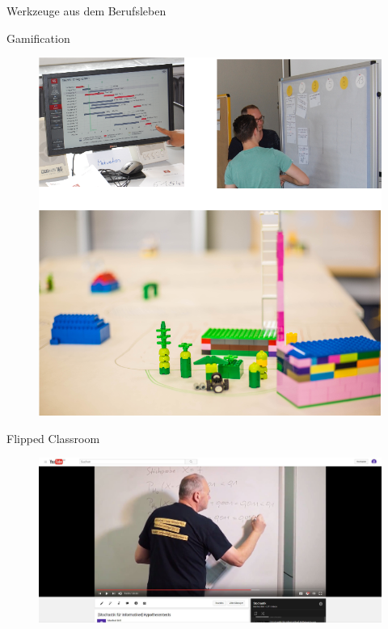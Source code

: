 \documentclass[final,hyperref={pdfpagelabels=false}]{beamer}
\begin{document}
\begin{frame}[t]
\begin{columns}[t]
\begin{column}{.465\textwidth}
\begin{block}{Werkzeuge aus dem Berufsleben}
\end{block}


\begin{block}{Gamification}


    \begin{figure}
        \centering
        \includegraphics[width=0.76\linewidth]{imagesExample/gamification}
        \label{fig:gamification}
    \end{figure}

\end{block}


\begin{block}{Flipped Classroom}
    \vspace{40px}
    \begin{figure}
        \centering
        \includegraphics[width=0.8\linewidth]{imagesExample/youtube2}
        \label{fig:youtube2}
    \end{figure}
\end{block}


\end{column}
\end{columns}
\end{frame}
\end{document}
